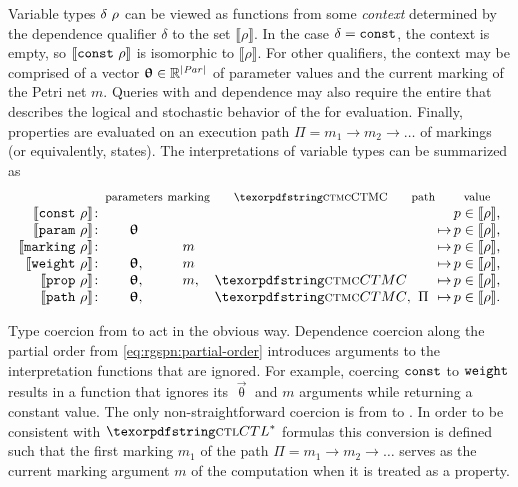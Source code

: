 Variable types \(\delta\ \rho\) can be viewed as functions from some \emph{context} determined by the dependence qualifier \(\delta\) to the set \(\llbracket \rho \rrbracket\). In the case \(\delta = \texttt{\upshape const}\), the context is empty, so \(\llbracket \texttt{\upshape const}\ \rho \rrbracket\) is isomorphic to \(\llbracket \rho \rrbracket\). For other qualifiers, the context may be comprised of a vector \(\bm{\mathrm{\uptheta}} \in \mathbb{R}^{\lvert \textrm{\itshape Par\/} \rvert}\) of parameter values and the current marking of the Petri net \(m\). Queries with  and  dependence may also require the entire  that describes the logical and stochastic behavior of the  for evaluation. Finally,  properties are evaluated on an execution path \(\Pi = m_1 \to m_2 \to \ldots\) of markings (or equivalently,  states). The interpretations of variable types can be summarized as
\begin{equation}
  \begin{array}{@{}r@{\,}c@{\ }c@{\ }c@{\ }c@{\,}l@{\,}c@{}}
    & \text{\footnotesize parameters} & \text{\footnotesize marking} & \text{\footnotesize \textabbr{CTMC}} & \text{\footnotesize path} & & \text{\footnotesize value} \\*
    \llbracket \vartype{\lit{const}}{\rho} \rrbracket \colon& & & & & &p \in \llbracket \rho \rrbracket \text, \\
    \llbracket \vartype{\lit{param}}{\rho} \rrbracket \colon& \vec{\uptheta} & & & & \mapsto &p \in \llbracket \rho \rrbracket \text, \\
    \llbracket \vartype{\lit{marking}}{\rho} \rrbracket \colon& & m & & & \mapsto &p \in \llbracket \rho \rrbracket \text, \\
    \llbracket \vartype{\lit{weight}}{\rho} \rrbracket \colon& \vec{\uptheta}\mathrlap, & m & & & \mapsto &p \in \llbracket \rho \rrbracket \text, \\
    \llbracket \vartype{\lit{prop}}{\rho} \rrbracket \colon& \vec{\uptheta}\mathrlap, & m\mathrlap, & \textabbr{CTMC} & & \mapsto &p \in \llbracket \rho \rrbracket \text, \\
    \llbracket \vartype{\lit{path}}{\rho} \rrbracket \colon& \vec{\uptheta}\mathrlap, & & \textabbr{CTMC}\mathrlap, & \Pi & \mapsto &p \in \llbracket \rho \rrbracket \text. \\
  \end{array}
\end{equation}

Type coercion from  to  act in the obvious way. Dependence coercion along the partial order from \vref{eq:rgspn:partial-order} introduces arguments to the interpretation functions that are ignored. For example, coercing \(\texttt{\upshape const}\) to \(\texttt{\upshape weight}\) results in a function that ignores its \(\vec{\uptheta}\) and \(m\) arguments while returning a constant value. The only non-straightforward coercion is from  to . In order to be consistent with \(\textabbr{CTL}^*\) formulas this conversion is defined such that the first marking \(m_1\) of the path \(\Pi = m_1 \to m_2 \to \ldots\) serves as the current marking argument \(m\) of the  computation when it is treated as a  property.

